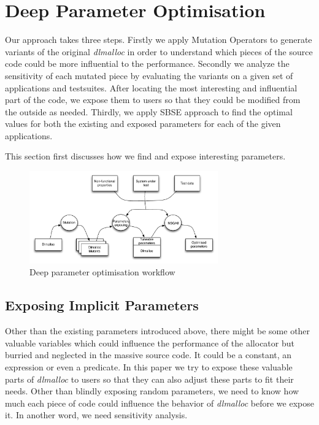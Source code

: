 \section{Deep Parameter Optimisation}

Our approach takes three steps. Firstly we apply Mutation Operators to generate variants of the original \emph{dlmalloc} in order to understand which pieces of the source code could be more influential to the performance. Secondly we analyze the sensitivity of each mutated piece by evaluating the variants on a given set of applications and testsuites. After locating the most interesting and influential part of the code, we expose them to users so that they could be modified from the outside as needed. Thirdly, we apply SBSE approach to find the optimal values for both the existing and exposed parameters for each of the given applications.

This section first discusses how we find and expose interesting parameters.

\begin{figure}[htbp]
\centering
\includegraphics[width=3.2in]{pics/system}
\caption{Deep parameter optimisation workflow}\label{system}
\end{figure}


\subsection{Exposing Implicit Parameters}
Other than the existing parameters introduced above, there might be some other valuable variables which could influence the performance of the allocator but burried and neglected in the massive source code. It could be a constant, an expression or even a predicate. In this paper we try to expose these valuable parts of \emph{dlmalloc} to users so that they can also adjust these parts to fit their needs. Other than blindly exposing random parameters, we need to know how much each piece of code could influence the behavior of \emph{dlmalloc} before we expose it. In another word, we need sensitivity analysis.

